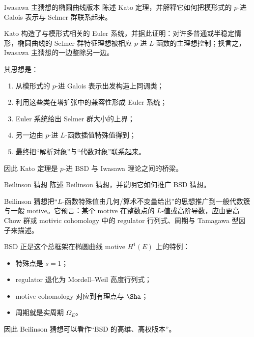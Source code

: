 \begin{problem}{Iwasawa 主猜想的椭圆曲线版本 \hard}
陈述 Kato 定理，并解释它如何把模形式的 $p$-进 Galois 表示与 Selmer 群联系起来。
\end{problem}
\begin{solution}
Kato 构造了与模形式相关的 Euler 系统，并据此证明：对许多普通或半稳定情形，椭圆曲线的 Selmer 群特征理想被相应 $p$-进 $L$-函数的主理想控制；换言之，Iwasawa 主猜想的一边整除另一边。

其思想是：
\begin{enumerate}[label=\arabic*.]
  \item 从模形式的 $p$-进 Galois 表示出发构造上同调类；
  \item 利用这些类在塔扩张中的兼容性形成 Euler 系统；
  \item Euler 系统给出 Selmer 群大小的上界；
  \item 另一边由 $p$-进 $L$-函数插值特殊值得到；
  \item 最终把“解析对象”与“代数对象”联系起来。
\end{enumerate}
因此 Kato 定理是 $p$-进 BSD 与 Iwasawa 理论之间的桥梁。
\end{solution}

\begin{problem}{Beilinson 猜想 \hard}
陈述 Beilinson 猜想，并说明它如何推广 BSD 猜想。
\end{problem}
\begin{solution}
Beilinson 猜想把“$L$-函数特殊值由几何/算术不变量给出”的思想推广到一般代数簇与一般 motive。它预言：某个 motive 在整数点的 $L$-值或高阶导数，应由更高 Chow 群或 motivic cohomology 中的 regulator 行列式、周期与 Tamagawa 型因子来描述。

BSD 正是这个总框架在椭圆曲线 motive $H^1(E)$ 上的特例：
\begin{itemize}
  \item 特殊点是 $s=1$；
  \item regulator 退化为 Mordell--Weil 高度行列式；
  \item motive cohomology 对应到有理点与 $\Sha$；
  \item 周期就是实周期 $\Omega_E$。
\end{itemize}
因此 Beilinson 猜想可以看作“BSD 的高维、高权版本”。
\end{solution}

